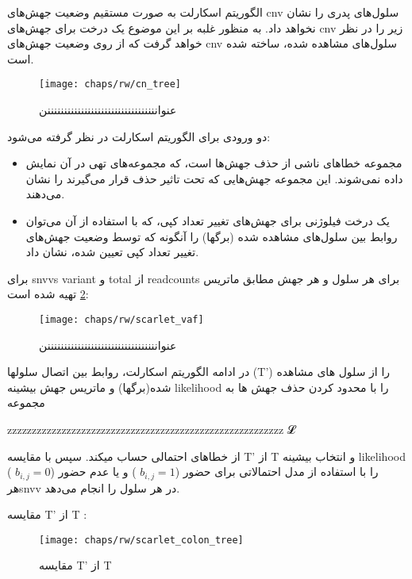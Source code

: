 الگوریتم اسکارلت به صورت مستقیم وضعیت جهش‌های \gls{cnv} سلول‌های پدری را نشان نخواهد داد. به منظور غلبه بر این موضوع یک درخت برای جهش‌های \gls{cnv} زیر را در نظر خواهد گرفت که از روی وضعیت جهش‌های \gls{cnv} سلو‌‌ل‌های مشاهده شده، ساخته شده است. 


\begin{figure}[!ht]
	\centerline{\texttt{[image: chaps/rw/cn\_tree]}}
	\caption{عنوانننننننننننننننننننننننننننننننننن}
	\label{fig:ch_rw:cn_tree}
\end{figure}


دو ورودی برای الگوریتم اسکارلت در نظر گرفته می‌شود: 
\begin{itemize}
	\item مجموعه خطاهای ناشی از حذف جهش‌ها است، که مجموعه‌های تهی در آن نمایش داده نمی‌شوند. این مجموعه جهش‌هایی که تحت تاثیر حذف قرار می‌گیرند را نشان می‌دهند. 
	\item یک درخت فیلوژنی برای جهش‌های تغییر تعداد کپی، که با استفاده از آن می‌توان روابط بین سلول‌های مشاهده شده (برگها) را آنگونه که توسط وضعیت جهش‌های تغییر تعداد کپی تعیین شده، نشان داد.
\end{itemize}


 

  

برای \glspl{snvv} \gls{variant}   و  \gls{total}   از  \gls{readcounts} برای هر سلول و هر جهش مطابق ماتریس \ref{fig:ch_rw:scarlet_vaf} تهیه شده است: 

\begin{figure}[!ht]
	\centerline{\texttt{[image: chaps/rw/scarlet\_vaf]}}
	\caption{عنوانننننننننننننننننننننننننننننننننن}
	\label{fig:ch_rw:scarlet_vaf}
\end{figure}


در ادامه  الگوریتم اسکارلت، روابط بین اتصال سلولها (T’) را  از سلول های مشاهده شده(برگها) و ماتریس جهش بیشینه \gls{likelihood}  را با محدود کردن حذف جهش ها به مجموعه

zzzzzzzzzzzzzzzzzzzzzzzzzzzzzzzzzzzzzzzzzzzzzzzzzzzzzzzz
𝓛

از خطاهای احتمالی حساب میکند. سپس با مقایسه T’ از T و انتخاب بیشینه  \gls{likelihood}  را با استفاده از مدل احتمالاتی برای حضور ($b_{i,j} = 1$ )  و یا عدم حضور ($b_{i,j} = 0$ ) هر\gls{snvv} در هر سلول را انجام می‌دهد. 

مقایسه T’ از T :
\begin{figure}[!ht]
	\centerline{\texttt{[image: chaps/rw/scarlet\_colon\_tree]}}
	\caption{مقایسه T’ از T}
	\label{fig:ch_rw:scarlet_colon_tree}
\end{figure}

